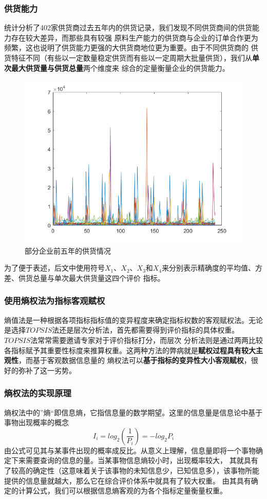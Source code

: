 \documentclass{cumcmthesis}
\begin{document}
\subsubsection*{供货能力}
统计分析了402家供货商过去五年内的供货记录，我们发现不同供货商间的供货能力存在较大差异，而那些具有较强
原料生产能力的供货商与企业的订单合作更为频繁，这也说明了供货能力更强的大供货商地位更为重要。由于不同供货商的
供货特征不同（有些以一定数量稳定供货而有些以一定周期大批量供货），我们从\textbf{单次最大供货量与供货总量}两个维度来
综合的定量衡量企业的供货能力。\par
\begin{figure}[htbp]
    \centering
    \includegraphics[scale=0.6]{offer.png}
    \caption{部分企业前五年的供货情况}     \label{fig:1}
\end{figure}

为了便于表述，后文中使用符号$X_1$、$X_2$、$X_3$和$X_4$来分别表示精确度的平均值、方差、供货总量与单次最大供货量这四个评价
指标。

\subsubsection{使用熵权法为指标客观赋权}
熵值法是一种根据各项指标指标值的变异程度来确定指标权数的客观赋权法。无论是选择$TOPSIS$法还是层次分析法，首先都需要得到评价指标的具体权重。$TOPSIS$法常常需要邀请专家对于评价指标打分，而层次
分析法则是通过两两比较各指标赋予其重要性标度来推算权重。这两种方法的弊病就是\textbf{赋权过程具有较大主观性}，而基于客观数据信息量的
熵权法可以\textbf{基于指标的变异性大小客观赋权}，很好的弥补了这一劣势。
\subsubsection*{熵权法的实现原理}
熵权法中的”熵“即信息熵，它指信息量的数学期望。这里的信息量是信息论中基于事物出现概率的概念
\begin{equation}
    I_i = log_2(\frac{1}{P_i})=-log_2P_i
    \label{信息量}
\end{equation}
由公式可见其与某事件出现的概率成反比。从意义上理解，信息量即将一个事物确定下来需要查询的信息的量。当某事物信息熵较小时，出现概率较大，
其就具有了较高的确定性（这意味着关于该事物的未知信息少，已知信息多），该事物所能提供的信息量就越大，那么它在综合评价体系中就具有了较大权重。
由其具有确定的计算公式，我们可以根据信息熵客观的为各个指标定量衡量权重。
\end{document}

